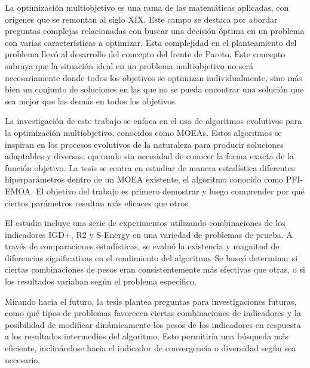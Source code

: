


\begin{abstracts}        %


La optimización multiobjetivo es una rama de las matemáticas aplicadas, con orígenes que se remontan al siglo XIX. Este campo se destaca por abordar preguntas complejas relacionadas con buscar una decisión óptima en un problema con varias características a optimizar. Esta complejidad en el planteamiento del problema llevó al desarrollo del concepto del frente de Pareto. Este concepto subraya que la situación ideal en un problema multiobjetivo no será necesariamente donde todos los  objetivos se optimizan individualmente, sino más bien un conjunto de soluciones en las que no se pueda encontrar una solución que sea mejor que las demás en todos los objetivos.

La investigación de este trabajo se enfoca en el uso de algoritmos evolutivos para la optimización multiobjetivo, conocidos como MOEAs. Estos algoritmos se inspiran en los procesos evolutivos de la naturaleza para producir soluciones adaptables y diversas, operando sin necesidad de conocer la forma exacta de la función objetivo. La tesis se centra en estudiar de manera estadística diferentes hiperparámetros dentro de un MOEA existente, el algoritmo conocido como PFI-EMOA. El objetivo del trabajo es primero demostrar y luego comprender por qué ciertos parámetros resultan más eficaces que otros.

El estudio incluye una serie de experimentos utilizando combinaciones de los indicadores IGD+, R2 y S-Energy en una variedad de problemas de prueba. A través de comparaciones estadísticas, se evaluó la existencia y magnitud de diferencias significativas en el rendimiento del algoritmo. Se buscó determinar si ciertas combinaciones de pesos eran consistentemente más efectivas que otras, o si los resultados variaban según el problema específico.

Mirando hacia el futuro, la tesis plantea preguntas para investigaciones futuras, como qué tipos de problemas favorecen ciertas combinaciones de indicadores y la posibilidad de modificar dinámicamente los pesos de los indicadores en respuesta a los resultados intermedios del algoritmo. Esto permitiría una búsqueda más eficiente, inclinándose hacia el indicador de convergencia o diversidad según sea necesario.

\end{abstracts}


